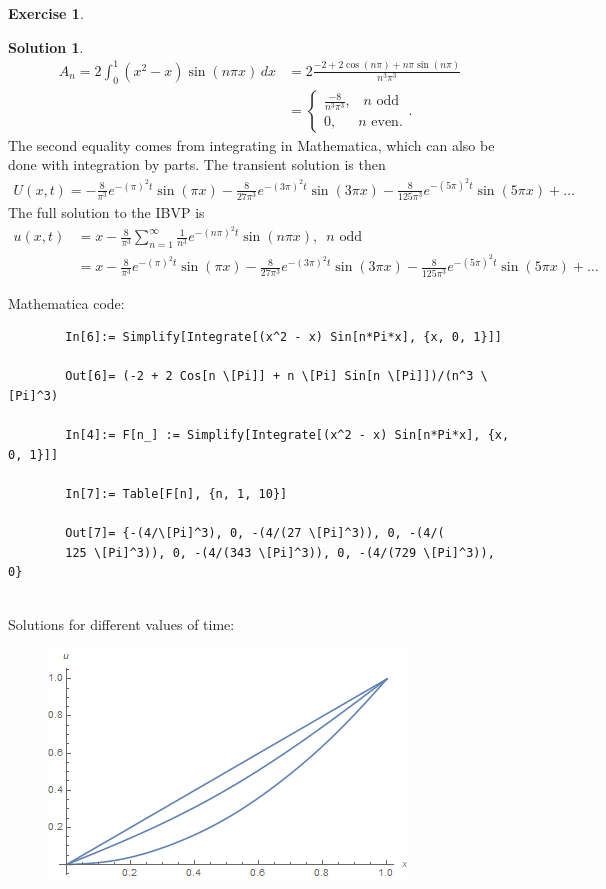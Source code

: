 \documentclass{book}
\theoremstyle{definition}
\newtheorem*{exer*}{Exercise}
\newtheorem*{sln*}{Solution}
\begin{document}
\begin{exer*}
\begin{sln*}
\begin{align*}
		A_n = 2\int_{0}^{1}(x^2 - x)\sin(n\pi x)\,dx &= 2\frac{-2+2\cos(n\pi) + n\pi\sin(n\pi)}{n^3\pi^3}\\
		&= \begin{cases}
		\frac{-8}{n^3\pi^3},\,\,\,\,\, n \text{ odd}\\
		0,\,\,\,\,\,\,\,\,\, n \text{ even}.
		\end{cases}.
		\end{align*}
		The second equality comes from integrating in Mathematica, which can also be done with integration by parts. The transient solution is then
		\begin{align*}
		U(x,t) = -\frac{8}{\pi ^3}e^{-(\pi)^2t} \sin(\pi x)   -\frac{8}{27 \pi ^3}e^{-(3\pi)^2t} \sin(3\pi x)    -\frac{8}{125 \pi ^3}e^{-(5\pi)^2t} \sin(5\pi x)  + \dots
		\end{align*}
		The full solution to the IBVP is
		\begin{align*}
		u(x,t) &= x- \frac{8}{\pi^3}\sum_{n=1}^\infty\frac{1}{n^3}e^{-(n\pi)^2t}\sin(n\pi x),\,\,\, n \text{ odd} \\ 
		&= x -\frac{8}{\pi ^3}e^{-(\pi)^2t} \sin(\pi x)   -\frac{8}{27 \pi ^3}e^{-(3\pi)^2t} \sin(3\pi x)    -\frac{8}{125 \pi ^3}e^{-(5\pi)^2t} \sin(5\pi x)  + \dots
		\end{align*}
		
		\newpage
		
		\noindent Mathematica code:
		\begin{lstlisting}
		In[6]:= Simplify[Integrate[(x^2 - x) Sin[n*Pi*x], {x, 0, 1}]]
		
		Out[6]= (-2 + 2 Cos[n \[Pi]] + n \[Pi] Sin[n \[Pi]])/(n^3 \[Pi]^3)
		
		In[4]:= F[n_] := Simplify[Integrate[(x^2 - x) Sin[n*Pi*x], {x, 0, 1}]]
		
		In[7]:= Table[F[n], {n, 1, 10}]
		
		Out[7]= {-(4/\[Pi]^3), 0, -(4/(27 \[Pi]^3)), 0, -(4/(
		125 \[Pi]^3)), 0, -(4/(343 \[Pi]^3)), 0, -(4/(729 \[Pi]^3)), 0}
		\end{lstlisting}
		$\,$\\
		\noindent Solutions for different values of time:\\
		
		\begin{figure}[h!]
			\centering
			\includegraphics[scale=0.7]{pset2_1.png}
		\end{figure}
		

\end{sln*}
\end{exer*}
\end{document}
